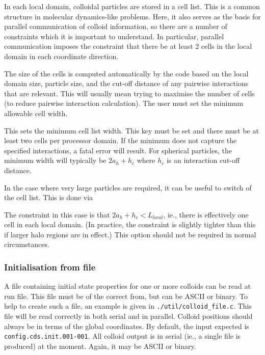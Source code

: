 In each local domain, colloidal particles are stored in a cell list.
This is a common structure in molecular dynamics-like problems. Here,
it also serves as the basis for parallel communication of colloid
information, so there are a number of constraints which it is important
to understand. In particular, parallel communication imposes the
constraint that there be at least 2 cells in the local domain in
each coordinate direction.

The size of the cells is computed automatically by the code based on
the local domain size, particle size, and the cut-off distance of any
pairwise interactions that are relevant. This will usually mean trying
to maximise the number of cells (to reduce pairwise interaction
calculation). The user must set the minimum allowable cell width.


This sets the minimum cell list width. This key must be set and there
must be at least two cells per processor domain. If the minimum does
not capture the specified interactions, a fatal error will result.
For spherical particles, the minimum width will typically be
$2a_h + h_c$ where $h_c$ is an interaction cut-off distance.


In the case where very large particles are required, it can be useful
to switch of the cell list. This is done via


The constraint in this case is that $2a_h + h_c < L_{local}$, ie.,
there is effectively one cell in each local domain. (In practice,
the constraint is slightly tighter than this if larger halo regions
are in effect.) This option
should not be required in normal circumstances.


\subsubsection{Initialisation from file}

A file containing initial state properties for one or more colloids
can be read at run file. This file must be of the correct from, but
can be ASCII or binary. To help to create such a file, an example
is given in \texttt{./util/colloid\_file.c}. This file will be
read correctly in both serial and in parallel. Colloid positions
should always be in terms of the global coordinates. By default,
the input expected is \texttt{config.cds.init.001-001}.
All colloid output is in serial (ie., a single file is produced)
at the moment. Again, it may be ASCII or binary.

